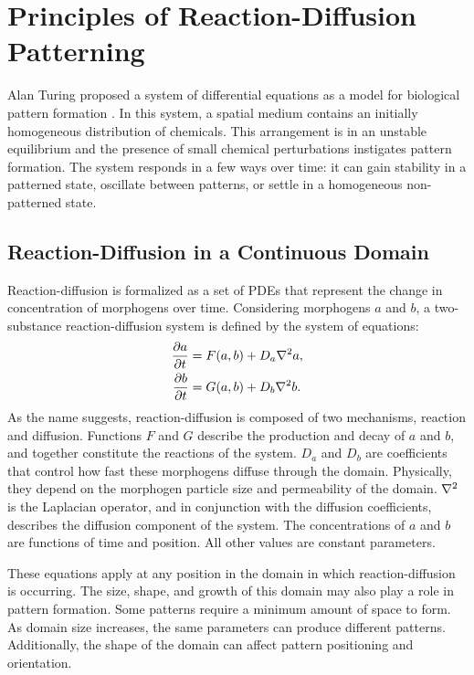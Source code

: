 \chapter{Principles of Reaction-Diffusion Patterning} 
Alan Turing proposed a system of differential equations as a model for biological pattern formation \citep{turing1952}. In this system, a spatial medium contains an initially homogeneous distribution of chemicals. This arrangement is in an unstable equilibrium and the presence of small chemical perturbations instigates pattern formation. The system responds in a few ways over time: it can gain stability in a patterned state, oscillate between patterns, or settle in a homogeneous non-patterned state. 

\section{Reaction-Diffusion in a Continuous Domain}
Reaction-diffusion is formalized as a set of PDEs that represent the change in concentration of morphogens over time. Considering morphogens $a$ and $b$, a two-substance reaction-diffusion system is defined by the system of equations:
	\begin{equation}
	\begin{aligned} \label{eq:basicRD}
		\frac{\partial a}{\partial t} &= F(a, b) + D_a \nabla^2 a,\\
		\frac{\partial b}{\partial t} &= G(a, b) + D_b \nabla^2 b.
	\end{aligned}
	\end{equation}
As the name suggests, reaction-diffusion is composed of two mechanisms, reaction and diffusion. Functions $F$ and $G$ describe the production and decay of $a$ and $b$, and together constitute the reactions of the system. $D_a$ and $D_b$ are coefficients that control how fast these morphogens diffuse through the domain. Physically, they depend on the morphogen particle size and permeability of the domain. $\nabla^2{}$ is the Laplacian operator, and in conjunction with the diffusion coefficients, describes the diffusion component of the system. The concentrations of $a$ and $b$ are functions of time and position. All other values are constant parameters.

These equations apply at any position in the domain in which reaction-diffusion is occurring. The size, shape, and growth of this domain may also play a role in pattern formation. Some patterns require a minimum amount of space to form. As domain size increases, the same parameters can produce different patterns. Additionally, the shape of the domain can affect pattern positioning and orientation.

